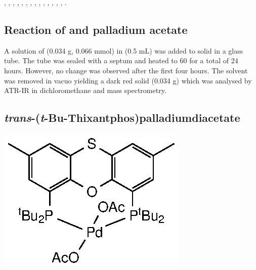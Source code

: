 ,
,
,
,
,
,
,
,
,
,
,
,
,
,
.


\subsection*{Reaction of \tBusixantphos{} and palladium acetate}

A solution of \tBusixantphos{} (0.034 g, 0.066 mmol) in  (0.5 mL) was added to solid \ce{[Pd(OAc)2]} in a glass tube.  The tube was sealed with a septum and heated to 60 \degC for a total of 24 hours.  However, no change was observed after the first four hours.  The solvent was removed in vacuo yielding a dark red solid (0.034 g) which was analysed by ATR-IR in dichloromethane and mass spectrometry.  

\subsection*{\emph{trans}-(\emph{t}-Bu-Thixantphos)palladiumdiacetate}

\begin{structure}[h]
\begin{center}
\includegraphics{../Structures/StBuPdOAc2.eps}
\end{center}
\end{structure}

